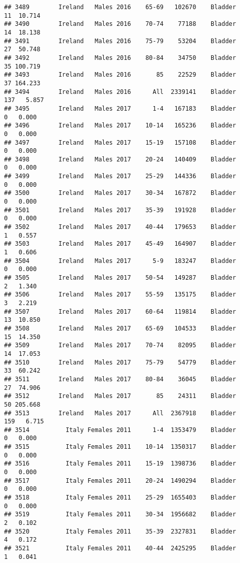 \documentclass[
]{article}
\begin{document}
\begin{verbatim}
## 3489        Ireland   Males 2016    65-69   102670    Bladder     11  10.714
## 3490        Ireland   Males 2016    70-74    77188    Bladder     14  18.138
## 3491        Ireland   Males 2016    75-79    53204    Bladder     27  50.748
## 3492        Ireland   Males 2016    80-84    34750    Bladder     35 100.719
## 3493        Ireland   Males 2016       85    22529    Bladder     37 164.233
## 3494        Ireland   Males 2016      All  2339141    Bladder    137   5.857
## 3495        Ireland   Males 2017      1-4   167183    Bladder      0   0.000
## 3496        Ireland   Males 2017    10-14   165236    Bladder      0   0.000
## 3497        Ireland   Males 2017    15-19   157108    Bladder      0   0.000
## 3498        Ireland   Males 2017    20-24   140409    Bladder      0   0.000
## 3499        Ireland   Males 2017    25-29   144336    Bladder      0   0.000
## 3500        Ireland   Males 2017    30-34   167872    Bladder      0   0.000
## 3501        Ireland   Males 2017    35-39   191928    Bladder      0   0.000
## 3502        Ireland   Males 2017    40-44   179653    Bladder      1   0.557
## 3503        Ireland   Males 2017    45-49   164907    Bladder      1   0.606
## 3504        Ireland   Males 2017      5-9   183247    Bladder      0   0.000
## 3505        Ireland   Males 2017    50-54   149287    Bladder      2   1.340
## 3506        Ireland   Males 2017    55-59   135175    Bladder      3   2.219
## 3507        Ireland   Males 2017    60-64   119814    Bladder     13  10.850
## 3508        Ireland   Males 2017    65-69   104533    Bladder     15  14.350
## 3509        Ireland   Males 2017    70-74    82095    Bladder     14  17.053
## 3510        Ireland   Males 2017    75-79    54779    Bladder     33  60.242
## 3511        Ireland   Males 2017    80-84    36045    Bladder     27  74.906
## 3512        Ireland   Males 2017       85    24311    Bladder     50 205.668
## 3513        Ireland   Males 2017      All  2367918    Bladder    159   6.715
## 3514          Italy Females 2011      1-4  1353479    Bladder      0   0.000
## 3515          Italy Females 2011    10-14  1350317    Bladder      0   0.000
## 3516          Italy Females 2011    15-19  1398736    Bladder      0   0.000
## 3517          Italy Females 2011    20-24  1490294    Bladder      0   0.000
## 3518          Italy Females 2011    25-29  1655403    Bladder      0   0.000
## 3519          Italy Females 2011    30-34  1956682    Bladder      2   0.102
## 3520          Italy Females 2011    35-39  2327831    Bladder      4   0.172
## 3521          Italy Females 2011    40-44  2425295    Bladder      1   0.041

\end{verbatim}
\end{document}
